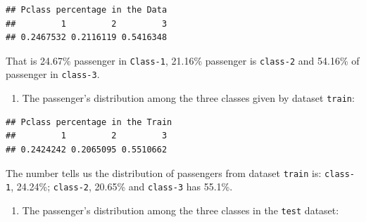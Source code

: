 \documentclass[
]{book}
\newenvironment{Shaded}{\begin{snugshade}}{\end{snugshade}}
\newcommand{\CommentTok}[1]{\textcolor[rgb]{0.56,0.35,0.01}{\textit{#1}}}
\newcommand{\DataTypeTok}[1]{\textcolor[rgb]{0.13,0.29,0.53}{#1}}
\newcommand{\KeywordTok}[1]{\textcolor[rgb]{0.13,0.29,0.53}{\textbf{#1}}}
\newcommand{\NormalTok}[1]{#1}
\newcommand{\OperatorTok}[1]{\textcolor[rgb]{0.81,0.36,0.00}{\textbf{#1}}}
\newcommand{\StringTok}[1]{\textcolor[rgb]{0.31,0.60,0.02}{#1}}
\providecommand{\tightlist}{%
  \setlength{\itemsep}{0pt}\setlength{\parskip}{0pt}}
\begin{document}
\begin{verbatim}
## Pclass percentage in the Data
##         1         2         3 
## 0.2467532 0.2116119 0.5416348
\end{verbatim}

That is 24.67\% passenger in \texttt{Class-1}, 21.16\% passenger is \texttt{class-2} and 54.16\% of passenger in \texttt{class-3}.

\begin{enumerate}
\def\labelenumi{\arabic{enumi}.}
\setcounter{enumi}{1}
\tightlist
\item
  The passenger's distribution among the three classes given by dataset \texttt{train}:
\end{enumerate}

\begin{Shaded}
\end{Shaded}

\begin{verbatim}
## Pclass percentage in the Train
##         1         2         3 
## 0.2424242 0.2065095 0.5510662
\end{verbatim}

The number tells us the distribution of passengers from dataset \texttt{train} is: \texttt{class-1}, 24.24\%; \texttt{class-2}, 20.65\% and \texttt{class-3} has 55.1\%.

\begin{enumerate}
\def\labelenumi{\arabic{enumi}.}
\setcounter{enumi}{2}
\tightlist
\item
  The passenger's distribution among the three classes in the \texttt{test} dataset:
\end{enumerate}

\begin{Shaded}
\end{Shaded}
\end{document}
